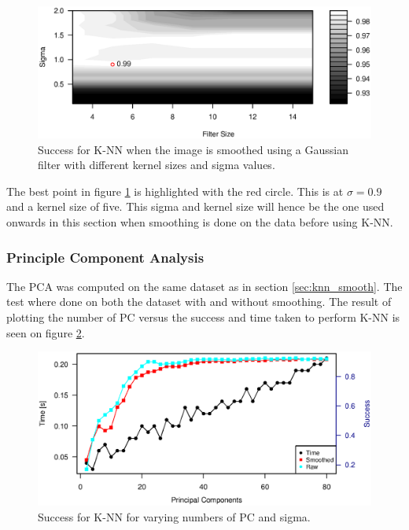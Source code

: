 \begin{figure}[H]
\centering
\includegraphics[width = 0.95 \textwidth]{graphics/knn_smooth_cont}
\caption{Success for K-NN when the image is smoothed using a Gaussian filter with different kernel sizes and sigma values.}
\label{fig:cont_smooth_gaus_knn}
\end{figure}

The best point in figure \ref{fig:cont_smooth_gaus_knn} is highlighted with the red circle.
This is at $\sigma = 0.9$ and a kernel size of five.
This sigma and kernel size will hence be the one used onwards in this section when smoothing is done on the data before using K-NN.


\subsubsection{Principle Component Analysis}

The PCA was computed on the same dataset as in section \ref{sec:knn_smooth}.
The test where done on both the dataset with and without smoothing.
The result of plotting the number of PC versus the success and time taken to perform K-NN is seen on figure \ref{fig:plot_pca_knn}.

\begin{figure}[H]
\centering
\includegraphics[width = 0.95 \textwidth]{graphics/knn_pc}
\caption{Success for K-NN for varying numbers of PC and sigma.}
\label{fig:plot_pca_knn}
\end{figure}


